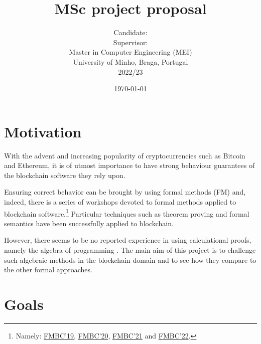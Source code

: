 \documentclass[a4paper, 11pt]{article} %
\title{\textbf{MSc project proposal}\\ \vspace{0.5cm}\msctitle}
\author{
	  Candidate:  \textsc{\msccandidate}
	\\Supervisor: \textsc{\mscsupervisor}
	\\
	\vspace{0.5cm}
    \normalsize{Master in Computer Engineering (MEI)\\ University of Minho, Braga, Portugal}
    \\ 2022/23
    } %
\date{\today}
\makeatletter
\renewcommand{\maketitle}{ %
\begin{center} %
{\LARGE\@title} %

\vspace{50pt} %

{\large\@author} %

\vspace{40pt} %
\end{center}
}
\makeatother
\begin{document}
\maketitle %






\section*{Motivation}

With the advent and increasing popularity of cryptocurrencies such as Bitcoin and Ethereum, it is of utmost importance to have strong behaviour guarantees of the blockchain software they rely upon.

Ensuring correct behavior can be brought by using formal methods (FM) and,
indeed, there is a series of workshops devoted to formal methods applied
to blockchain software.\footnote{Namely: \href{https://sites.google.com/view/fmbc}{FMBC'19}, \href{https://fmbc.gitlab.io/2020}{FMBC'20}, \href{https://fmbc.gitlab.io/2021}{FMBC'21} and \href{https://fmbc.gitlab.io/2022}{FMBC'22}.} Particular techniques such as theorem proving and
formal semantics have been successfully applied to blockchain.

However, there seems
to be no reported experience in using calculational proofs, namely the algebra
of programming \cite{BM97,PDBC}. The main aim of this project is to challenge such algebraic methods
in the blockchain domain and to see how they compare to the other formal approaches.

\section*{Goals}
\end{document}
